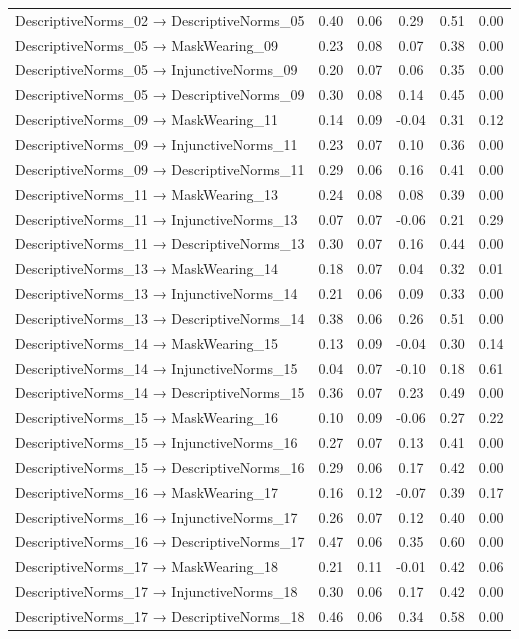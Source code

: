 \documentclass[
  man, donotrepeattitle,floatsintext]{apa6}
\begin{document}
\begin{center}
\begin{ThreePartTable}
{\begin{longtable}{lccccc}
DescriptiveNorms\_02 → DescriptiveNorms\_05 & 0.40 & 0.06 & 0.29 & 0.51 & 0.00\\
DescriptiveNorms\_05 → MaskWearing\_09 & 0.23 & 0.08 & 0.07 & 0.38 & 0.00\\
DescriptiveNorms\_05 → InjunctiveNorms\_09 & 0.20 & 0.07 & 0.06 & 0.35 & 0.00\\
DescriptiveNorms\_05 → DescriptiveNorms\_09 & 0.30 & 0.08 & 0.14 & 0.45 & 0.00\\
DescriptiveNorms\_09 → MaskWearing\_11 & 0.14 & 0.09 & -0.04 & 0.31 & 0.12\\
DescriptiveNorms\_09 → InjunctiveNorms\_11 & 0.23 & 0.07 & 0.10 & 0.36 & 0.00\\
DescriptiveNorms\_09 → DescriptiveNorms\_11 & 0.29 & 0.06 & 0.16 & 0.41 & 0.00\\
DescriptiveNorms\_11 → MaskWearing\_13 & 0.24 & 0.08 & 0.08 & 0.39 & 0.00\\
DescriptiveNorms\_11 → InjunctiveNorms\_13 & 0.07 & 0.07 & -0.06 & 0.21 & 0.29\\
DescriptiveNorms\_11 → DescriptiveNorms\_13 & 0.30 & 0.07 & 0.16 & 0.44 & 0.00\\
DescriptiveNorms\_13 → MaskWearing\_14 & 0.18 & 0.07 & 0.04 & 0.32 & 0.01\\
DescriptiveNorms\_13 → InjunctiveNorms\_14 & 0.21 & 0.06 & 0.09 & 0.33 & 0.00\\
DescriptiveNorms\_13 → DescriptiveNorms\_14 & 0.38 & 0.06 & 0.26 & 0.51 & 0.00\\
DescriptiveNorms\_14 → MaskWearing\_15 & 0.13 & 0.09 & -0.04 & 0.30 & 0.14\\
DescriptiveNorms\_14 → InjunctiveNorms\_15 & 0.04 & 0.07 & -0.10 & 0.18 & 0.61\\
DescriptiveNorms\_14 → DescriptiveNorms\_15 & 0.36 & 0.07 & 0.23 & 0.49 & 0.00\\
DescriptiveNorms\_15 → MaskWearing\_16 & 0.10 & 0.09 & -0.06 & 0.27 & 0.22\\
DescriptiveNorms\_15 → InjunctiveNorms\_16 & 0.27 & 0.07 & 0.13 & 0.41 & 0.00\\
DescriptiveNorms\_15 → DescriptiveNorms\_16 & 0.29 & 0.06 & 0.17 & 0.42 & 0.00\\
DescriptiveNorms\_16 → MaskWearing\_17 & 0.16 & 0.12 & -0.07 & 0.39 & 0.17\\
DescriptiveNorms\_16 → InjunctiveNorms\_17 & 0.26 & 0.07 & 0.12 & 0.40 & 0.00\\
DescriptiveNorms\_16 → DescriptiveNorms\_17 & 0.47 & 0.06 & 0.35 & 0.60 & 0.00\\
DescriptiveNorms\_17 → MaskWearing\_18 & 0.21 & 0.11 & -0.01 & 0.42 & 0.06\\
DescriptiveNorms\_17 → InjunctiveNorms\_18 & 0.30 & 0.06 & 0.17 & 0.42 & 0.00\\
DescriptiveNorms\_17 → DescriptiveNorms\_18 & 0.46 & 0.06 & 0.34 & 0.58 & 0.00\\
\bottomrule
\end{longtable}

}

\end{ThreePartTable}
\end{center}
\end{document}
